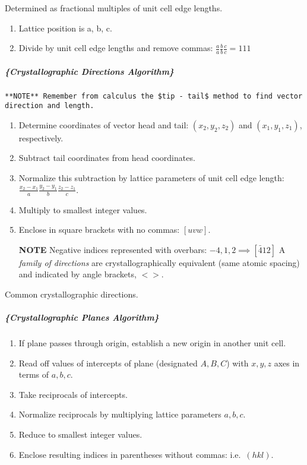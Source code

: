 \documentclass[
]{article}
\providecommand{\tightlist}{%
  \setlength{\itemsep}{0pt}\setlength{\parskip}{0pt}}
\begin{document}
\leavevmode\hypertarget{fig:point_coordinate_example}{}%
{Determined as fractional multiples of unit cell edge lengths.}

{}

\begin{enumerate}
\def\labelenumi{\arabic{enumi}.}
\tightlist
\item
  Lattice position is a, b, c.
\item
  Divide by unit cell edge lengths and remove commas:
  \(\frac{a}{a}\frac{b}{b}\frac{c}{c} = 111\)
\end{enumerate}

\hypertarget{crystallographic-directions-algorithm}{%
\subparagraph{\{Crystallographic Directions
Algorithm\}}\label{crystallographic-directions-algorithm}}

{}

\begin{verbatim}
**NOTE** Remember from calculus the $tip - tail$ method to find vector direction and length.
\end{verbatim}

\begin{enumerate}
\def\labelenumi{\arabic{enumi}.}
\item
  Determine coordinates of vector head and tail:
  \((x_{2}, y_{2}, z_{2})\) and \((x_{1}, y_{1}, z_{1})\), respectively.
\item
  Subtract tail coordinates from head coordinates.
\item
  Normalize this subtraction by lattice parameters of unit cell edge
  length:
  \(\frac{x_{2} - x_{1}}{a}\frac{y_{2} - y_{1}}{b}\frac{z_{2} - z_{1}}{c}\).
\item
  Multiply to smallest integer values.
\item
  Enclose in square brackets with no commas: \([uvw]\).

  \textbf{NOTE} Negative indices represented with overbars:
  \(-4, 1, 2 \implies [\bar{4}12]\) A \emph{family of directions} are
  crystallographically equivalent (same atomic spacing) and indicated by
  angle brackets, \(<>\).
\end{enumerate}

{Common crystallographic directions.}

\hypertarget{crystallographic-planes-algorithm}{%
\subparagraph{\{Crystallographic Planes
Algorithm\}}\label{crystallographic-planes-algorithm}}

\begin{enumerate}
\def\labelenumi{\arabic{enumi}.}
\tightlist
\item
  If plane passes through origin, establish a new origin in another unit
  cell.
\item
  Read off values of intercepts of plane (designated \(A, B, C\)) with
  \(x, y, z\) axes in terms of \(a, b, c\).
\item
  Take reciprocals of intercepts.
\item
  Normalize reciprocals by multiplying lattice parameters \(a, b, c\).
\item
  Reduce to smallest integer values.
\item
  Enclose resulting indices in parentheses without commas:
  i.e.~\((hkl)\).
\end{enumerate}
\end{document}
